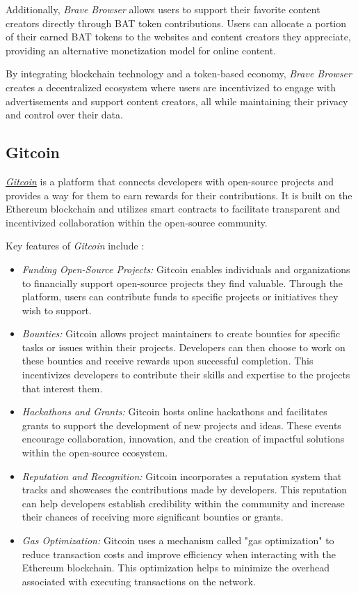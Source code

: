 Additionally, \textit{Brave Browser} allows users to support their favorite content creators directly through BAT token contributions. Users can allocate a portion of their earned BAT tokens to the websites and content creators they appreciate, providing an alternative monetization model for online content.\newline

By integrating blockchain technology and a token-based economy, \textit{Brave Browser} creates a decentralized ecosystem where users are incentivized to engage with advertisements and support content creators, all while maintaining their privacy and control over their data.\newline

\subsection{Gitcoin}

\href{https://www.gitcoin.co}{\textit{Gitcoin}} is a platform that connects developers with open-source projects and provides a way for them to earn rewards for their contributions. It is built on the Ethereum blockchain and utilizes smart contracts to facilitate transparent and incentivized collaboration within the open-source community.\newline

Key features of \textit{Gitcoin} include \cite{gitcoin}:

\begin{itemize}
    \item \textit{Funding Open-Source Projects:} Gitcoin enables individuals and organizations to financially support open-source projects they find valuable. Through the platform, users can contribute funds to specific projects or initiatives they wish to support.
    \item \textit{Bounties:} Gitcoin allows project maintainers to create bounties for specific tasks or issues within their projects. Developers can then choose to work on these bounties and receive rewards upon successful completion. This incentivizes developers to contribute their skills and expertise to the projects that interest them.
    \item \textit{Hackathons and Grants:} Gitcoin hosts online hackathons and facilitates grants to support the development of new projects and ideas. These events encourage collaboration, innovation, and the creation of impactful solutions within the open-source ecosystem.
    \item \textit{Reputation and Recognition:} Gitcoin incorporates a reputation system that tracks and showcases the contributions made by developers. This reputation can help developers establish credibility within the community and increase their chances of receiving more significant bounties or grants.
    \item \textit{Gas Optimization:} Gitcoin uses a mechanism called "gas optimization" to reduce transaction costs and improve efficiency when interacting with the Ethereum blockchain. This optimization helps to minimize the overhead associated with executing transactions on the network.
\end{itemize}

